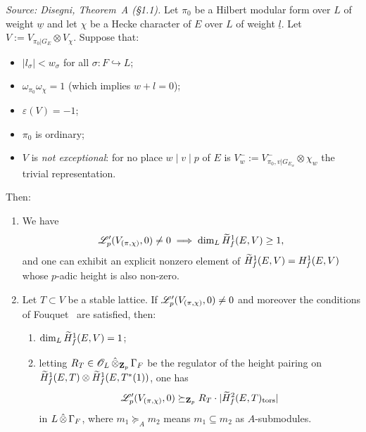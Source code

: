 \begin{theorem}
  \textit{Source: Disegni, Theorem~A (§1.1).}
  Let $\pi_0$ be a Hilbert modular form over $L$ of weight
  $\underline{w}$ and let $\chi$ be a Hecke character of $E$ over $L$ of
  weight $\underline{l}$.  Let $V := V_{\pi_0|G_E} \otimes V_\chi$.
  Suppose that:
  \begin{itemize}
    \item[(wt)] $|l_\sigma| < w_\sigma$ for all $\sigma \colon F
          \hookrightarrow L$;
    \item[(sd)] $\omega_{\pi_0}\omega_\chi = 1$ (which implies
          $w + l = 0$);
    \item[$(\varepsilon)$] $\varepsilon(V) = -1$;
    \item[(ord)] $\pi_0$ is ordinary;
    \item[(n-exc)] $V$ is \emph{not exceptional}: for no place
          $w \mid v \mid p$ of $E$ is
          $V_w^- := V^-_{\pi_0,v|G_{E_w}} \otimes \chi_w$ the trivial
          representation.
  \end{itemize}
  Then:
  \begin{enumerate}
    \item We have
          \[
            \mathscr{L}_p'(V_{(\pi,\chi)}, 0) \neq 0
            \;\Longrightarrow\;
            \dim_L \widetilde{H}^1_f(E, V) \geq 1,
          \]
          and one can exhibit an explicit nonzero element of
          $\widetilde{H}^1_f(E, V) = H^1_f(E, V)$ whose $p$-adic height is also
          non-zero.
    \item Let $T \subset V$ be a stable lattice.  If
          $\mathscr{L}_p'(V_{(\pi,\chi)}, 0) \neq 0$ and moreover the conditions
          of Fouquet~\cite[Theorem~B(i)]{fouquet} are satisfied, then:
          \begin{enumerate}
            \item $\dim_L \widetilde{H}^1_f(E, V) = 1$;
            \item letting $R_T \in \mathscr{O}_L\,\hat\otimes_{\mathbf{Z}_p}\,\Gamma_F$ be
                  the regulator of the height pairing on
                  $\widetilde{H}^1_f(E, T) \otimes \widetilde{H}^1_f(E, T^*(1))$, one has
                  \[
                    \mathscr{L}_p'(V_{(\pi,\chi)}, 0)
                    \succeq_{\mathbf{Z}_p}
                    R_T \cdot |\widetilde{H}^2_f(E, T)_{\mathrm{tors}}|
                  \]
                  in $L\,\hat\otimes\,\Gamma_F$, where $m_1 \succeq_A m_2$
                  means $m_1 \subseteq m_2$ as $A$-submodules.
          \end{enumerate}
  \end{enumerate}
\end{theorem}

